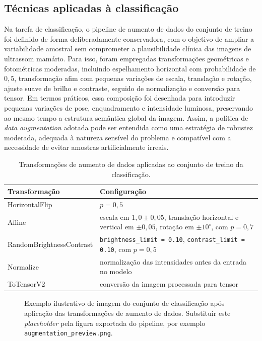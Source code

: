 \documentclass[tcc,capa]{texufpel}
\begin{document}
\subsection{Técnicas aplicadas à classificação}

Na tarefa de classificação, o pipeline de aumento de dados do conjunto de treino foi definido de forma deliberadamente conservadora, com o objetivo de ampliar a variabilidade amostral sem comprometer a plausibilidade clínica das imagens de ultrassom mamário. Para isso, foram empregadas transformações geométricas e fotométricas moderadas, incluindo espelhamento horizontal com probabilidade de \(0{,}5\), transformação afim com pequenas variações de escala, translação e rotação, ajuste suave de brilho e contraste, seguido de normalização e conversão para tensor. Em termos práticos, essa composição foi desenhada para introduzir pequenas variações de pose, enquadramento e intensidade luminosa, preservando ao mesmo tempo a estrutura semântica global da imagem. Assim, a política de \textit{data augmentation} adotada pode ser entendida como uma estratégia de robustez moderada, adequada à natureza sensível do problema e compatível com a necessidade de evitar amostras artificialmente irreais.

\begin{table}[htbp]
	\centering
	\caption{Transformações de aumento de dados aplicadas ao conjunto de treino da classificação.}
	\label{tab:augmentation_classification}
	\begin{tabular}{p{4.2cm} p{9.5cm}}
		\hline
		\textbf{Transformação} & \textbf{Configuração} \\[0.2cm]
		\hline
		HorizontalFlip & \(p = 0{,}5\) \\
		Affine & escala em \(1{,}0 \pm 0{,}05\), translação horizontal e vertical em \(\pm 0{,}05\), rotação em \(\pm 10^\circ\), com \(p = 0{,}7\) \\
		RandomBrightnessContrast & \texttt{brightness\_limit = 0.10}, \texttt{contrast\_limit = 0.10}, com \(p = 0{,}5\) \\
		Normalize & normalização das intensidades antes da entrada no modelo \\
		ToTensorV2 & conversão da imagem processada para tensor \\
		\hline
	\end{tabular}
\end{table}

\begin{figure}[htbp]
	\centering
	\fbox{\rule{0pt}{5cm}\rule{0.9\textwidth}{0pt}}
	\caption{Exemplo ilustrativo de imagem do conjunto de classificação após aplicação das transformações de aumento de dados. Substituir este \textit{placeholder} pela figura exportada do pipeline, por exemplo \texttt{augmentation\_preview.png}.}
	\label{fig:augmentation_classification_placeholder}
\end{figure}
\end{document}
